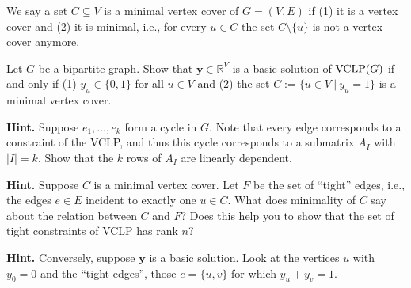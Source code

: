 \documentclass[11pt,a4paper,oneside]{article}
\newcommand{\R}{\mathbb{R}}
\newcommand{\y}{\mathbf{y}}
\begin{document}
We say a set $C \subseteq V$ is a minimal vertex cover of $G = (V,E)$ if 
(1) it is a vertex cover and (2) it is minimal, i.e., for every $u \in C$ the set
$C \setminus \{u\}$ is not a vertex cover anymore.

\begin{problem}{4}
	\statement
     Let $G$ be a bipartite graph.
    Show that $\y \in \R^{V}$ is a basic solution of ${\rm VCLP}(G)$ if and only if 
    (1) $y_u \in \{0,1\}$ for all $u \in V$ and (2) the set $C := \{u \in V \ | \ y_u = 1\}$ is a 
    minimal vertex cover.
    
    \solution
    
\end{problem}

\textbf{Hint.} Suppose $e_1,\dots,e_k$ form a cycle in $G$. Note that every edge corresponds
to a constraint of the VCLP, and thus this cycle corresponds to a submatrix $A_I$ with
$|I|= k$. Show that the $k$ rows of $A_I$ are linearly dependent. 

\textbf{Hint.} Suppose $C$ is a minimal vertex cover. Let $F$ be the set of ``tight'' edges, i.e., 
the edges $e \in E$ incident to exactly one $u \in C$. What does minimality of $C$ say 
about the relation between $C$ and $F$? Does this help you to show that the set
of tight constraints of VCLP has rank $n$?

\textbf{Hint.} Conversely, suppose $\y$ is a basic solution. Look at the vertices
$u$ with $y_0 = 0$ and the ``tight edges'', those $e = \{u,v\}$ for which $y_u + y_v = 1$.
\end{document}
